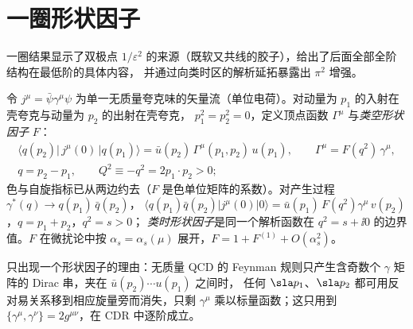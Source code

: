 \section{一圈形状因子}\label{sec:sudakov-oneloop}

一圈结果显示了双极点 $1/\varepsilon^2$ 的来源（既软又共线的胶子），给出了后面全部全阶结构在最低阶的具体内容，
并通过向类时区的解析延拓暴露出 $\pi^2$ 增强。

\begin{definition}[夸克形状因子]\label{def:sudakov-ff}
令 $j^\mu=\bar\psi\gamma^\mu\psi$ 为单一无质量夸克味的矢量流（单位电荷）。对动量为 $p_1$ 的入射在壳夸克与动量为 $p_2$ 的出射在壳夸克，
$p_1^2=p_2^2=0$，定义顶点函数 $\Gamma^\mu$ 与\emph{类空形状因子} $F$：
\begin{equation}\label{eq:sudakov-ff-def}
\begin{gathered}
\langle q(p_2)|\,j^\mu(0)\,|q(p_1)\rangle=\bar u(p_2)\,\Gamma^\mu(p_1,p_2)\,u(p_1),\qquad
\Gamma^\mu=F(q^2)\,\gamma^\mu,\\
q=p_2-p_1,\qquad Q^2\equiv-q^2=2p_1\cdot p_2>0 ;
\end{gathered}
\end{equation}
色与自旋指标已从两边约去（$F$ 是色单位矩阵的系数）。对产生过程 $\gamma^*(q)\to q(p_1)\,\bar q(p_2)$，
$\langle q(p_1)\bar q(p_2)|j^\mu(0)|0\rangle=\bar u(p_1)\,F(q^2)\gamma^\mu\,v(p_2)$，$q=p_1+p_2$，$q^2=s>0$；
\emph{类时形状因子}是同一个解析函数在 $q^2=s+\ii0$ 的边界值。$F$ 在微扰论中按 $\alpha_s=\alpha_s(\mu)$ 展开，$F=1+F^{(1)}+O(\alpha_s^2)$。
\end{definition}

只出现一个形状因子的理由：无质量 QCD 的 Feynman 规则只产生含奇数个 $\gamma$ 矩阵的 Dirac 串，夹在 $\bar u(p_2)\cdots u(p_1)$ 之间时，
任何 $\sla p_1$、$\sla p_2$ 都可用反对易关系移到相应旋量旁而消失，只剩 $\gamma^\mu$ 乘以标量函数；这只用到 $\{\gamma^\mu,\gamma^\nu\}=2g^{\mu\nu}$，在 CDR 中逐阶成立。

